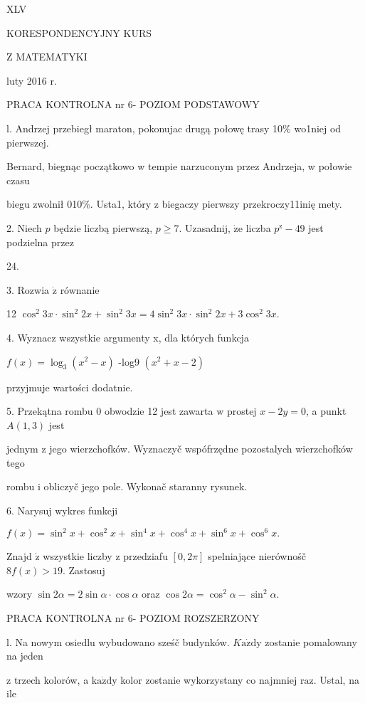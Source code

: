 \documentclass[a4paper,12pt]{article}
\begin{document}
XLV

KORESPONDENCYJNY KURS

Z MATEMATYKI

luty 2016 r.

PRACA KONTROLNA nr 6- POZIOM PODSTAWOWY

l. Andrzej przebiegł maraton, pokonujac drugą połowę trasy 10\% wo1niej od pierwszej.

Bernard, biegnąc początkowo w tempie narzuconym przez Andrzeja, w połowie czasu

biegu zwolnił 010\%. Usta1, który z biegaczy pierwszy przekroczy11inię mety.

2. Niech $p$ będzie liczbą pierwszą, $p\geq 7$. Uzasadnij, $\dot{\mathrm{z}}\mathrm{e}$ liczba $p^{\mathrm{z}}-49$ jest podzielna przez

24.

3. Rozwia $\dot{\mathrm{z}}$ równanie

12 $\cos^{2}3x\cdot\sin^{2}2x+\sin^{2}3x=4\sin^{2}3x\cdot\sin^{2}2x+3\cos^{2}3x.$

4. Wyznacz wszystkie argumenty x, dla których funkcja

$f(x)=\log_{3}(x^{2}-x)$ -log9 $(x^{2}+x-2)$

przyjmuje wartości dodatnie.

5. Przekątna rombu $0$ obwodzie 12 jest zawarta $\mathrm{w}$ prostej $x-2y=0$, a punkt $A(1,3)$ jest

jednym $\mathrm{z}$ jego wierzchofków. Wyznaczyč wspófrzędne pozostalych wierzchofków tego

rombu $\mathrm{i}$ obliczyč jego pole. Wykonač staranny rysunek.

6. Narysuj wykres funkcji

$f(x)=\sin^{2}x+\cos^{2}x+\sin^{4}x+\cos^{4}x+\sin^{6}x+\cos^{6}x.$

Znajd $\acute{\mathrm{z}}$ wszystkie liczby $\mathrm{z}$ przedziafu $[0,2\pi]$ spelniające nierównośč $8f(x)>19$. Zastosuj

wzory $\sin 2\alpha=2\sin\alpha\cdot\cos\alpha$ oraz $\cos 2\alpha=\cos^{2}\alpha-\sin^{2}\alpha.$




PRACA KONTROLNA nr 6- POZIOM ROZSZERZONY

l. Na nowym osiedlu wybudowano sześč budynków. $K\mathrm{a}\dot{\mathrm{z}}\mathrm{d}\mathrm{y}$ zostanie pomalowany na jeden

$\mathrm{z}$ trzech kolorów, a $\mathrm{k}\mathrm{a}\dot{\mathrm{z}}\mathrm{d}\mathrm{y}$ kolor zostanie wykorzystany co najmniej $\mathrm{r}\mathrm{a}\mathrm{z}$. Ustal, na ile
\end{document}

